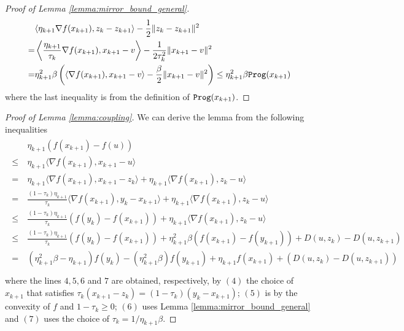 \begin{proof}[Proof of Lemma \ref{lemma:mirror_bound_general}]
\begin{align*}\label{actual_regret_linear_coupling}
     \begin{aligned}
        &\langle \eta_{k+1} \nabla f(x_{k+1}), z_k - z_{k+1} \rangle - \frac{1}{2}\|z_k - z_{k+1}\|^2  \\
        = & \left\langle \frac{\eta_{k+1}}{\tau_k} \nabla f(x_{k+1}), x_{k+1} - v \right\rangle - \frac{1}{2\tau_k^2} \|x_{k+1} - v \|^2 \\
        = & \eta_{k+1}^2 \beta \left( \langle \nabla f(x_{k+1}), x_{k+1} -v \rangle - \frac{\beta}{2} \|x_{k+1} - v\|^2\right) \leq \eta_{k+1}^2 \beta {\tt{Prog}}(x_{k+1})
    \end{aligned}
\end{align*}
where the last inequality is from the definition of ${\tt{Prog}}(x_{k+1})$.

\end{proof}


\begin{proof}[Proof of Lemma \ref{lemma:coupling}]
We can derive the lemma from the following inequalities
\begin{align*}\label{actual_regret_linear_coupling}
    \begin{aligned}
        &\ \eta_{k+1}(f(x_{k+1}) -f(u)) \\
        \leq &\ \eta_{k+1} \langle \nabla f(x_{k+1}), x_{k+1} -u \rangle \\
        = &\ \eta_{k+1} \langle \nabla f(x_{k+1}), x_{k+1} -z_{k} \rangle + \eta_{k+1} \langle \nabla f(x_{k+1}), z_k -u \rangle \\
        = &\ \frac{(1-\tau_k)\eta_{k+1}}{\tau_k} \langle \nabla f(x_{k+1}), y_k - x_{k+1} \rangle + \eta_{k+1} \langle \nabla f(x_{k+1}), z_k - u \rangle \\
        \leq &\ \frac{(1-\tau_k)\eta_{k+1}}{\tau_k}(f(y_k)-f(x_{k+1})) + \eta_{k+1} \langle \nabla f(x_{k+1}), z_k-u \rangle \\
        \leq &\ \frac{(1-\tau_k)\eta_{k+1}}{\tau_k}(f(y_k)-f(x_{k+1})) + \eta_{k+1}^2 \beta (f(x_{k+1}) - f(y_{k+1}))  + D(u, {z_k}) - D(u, z_{k+1})\\
            = &\ (\eta_{k+1}^2\beta -\eta_{k+1})f(y_k) -(\eta_{k+1}^2 \beta)f(y_{k+1})  +\eta_{k+1}f(x_{k+1})   + \left( D(u, {z_k}) - D(u, z_{k+1})\right)\\
    \end{aligned}
\end{align*}
where the lines $4,5,6$ and $7$ are obtained, respectively, by $(4)$ the choice of $x_{k+1}$ that satisfies $\tau_k(x_{k+1} - z_k) = (1-\tau_k) (y_k - x_{k+1})$; $(5)$ is by the convexity of $f$ and $1-\tau_k \geq 0$; $(6)$ uses Lemma \ref{lemma:mirror_bound_general} and $(7)$ uses the choice of $\tau_k = 1/\eta_{k+1}\beta$.
\end{proof}

